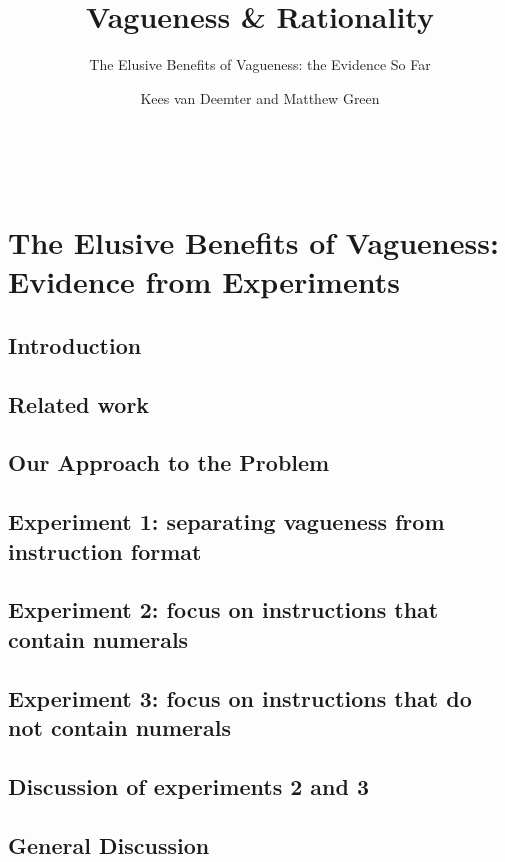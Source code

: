 \documentclass[ %
  graybox       %
 ,envcountchap  %
 ,sectrefs      %
 ,footinfo      %
 ,graphics      %
]{svmono}
\begin{document}
\author{Kees van Deemter and Matthew Green}
\title{Vagueness \& Rationality}
\subtitle{The Elusive Benefits of Vagueness: the Evidence So Far}
\maketitle
\frontmatter
\newpage~\newpage
\tableofcontents
\mainmatter
\chapter{The Elusive Benefits of Vagueness: Evidence from Experiments}\label{chapterlabel}

\section{Introduction}\label{introduction}
\section{Related work}\label{related-work}
\section{Our Approach to the Problem}\label{our-approach-to-the-problem}
\section{Experiment 1: separating vagueness from instruction format}\label{e1}
\section{Experiment 2: focus on instructions that contain numerals}\label{e2}
\section{Experiment 3: focus on instructions that do not contain numerals}\label{e3}
\section{Discussion of experiments 2 and 3}\label{discussion-of-e2-and-e3}
\section{General Discussion}\label{general-discussion}
\backmatter


\backmatter
\end{document}
